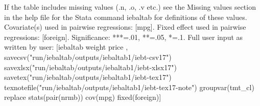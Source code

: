 If the table includes missing values (.n, .o, .v etc.) see the Missing values section in the help file for the Stata command iebaltab for definitions of these values. Covariate(s) used in pairwise regressions: [mpg]. Fixed effect used in pairwise regressions: [foreign]. Significance: ***=.01, **=.05, *=.1. Full user input as written by user: [iebaltab weight price , savecsv("run/iebaltab/outputs/iebaltab1/iebt-csv17") savexlsx("run/iebaltab/outputs/iebaltab1/iebt-xlsx17") savetex("run/iebaltab/outputs/iebaltab1/iebt-tex17") texnotefile("run/iebaltab/outputs/iebaltab1/iebt-tex17-note") groupvar(tmt\_cl) replace stats(pair(nrmb)) cov(mpg) fixed(foreign)] 
